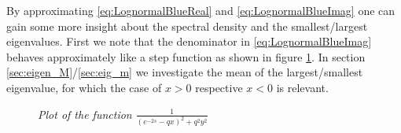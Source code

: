 By approximating \eqref{eq:LognormalBlueReal} and
\eqref{eq:LognormalBlueImag} one can gain some more insight about the
spectral density and the smallest/largest eigenvalues. First we note that the
denominator in \eqref{eq:LognormalBlueImag} behaves approximately like
a step function as shown in figure \ref{fig:BlueDenominator}. In
section \ref{sec:eigen_M}/\ref{sec:eig_m} we investigate the mean
of the largest/smallest eigenvalue, for which the case of $x>0$
respective $x<0$ is relevant.

\begin{figure}[htb!]
  \centering
  \caption{\small \it Plot of the function
    $\frac{
      1
    }{
      (e^{-2s} - qx)^2 + q^2 y^2  
    }$}
  \label{fig:BlueDenominator}
\end{figure}

